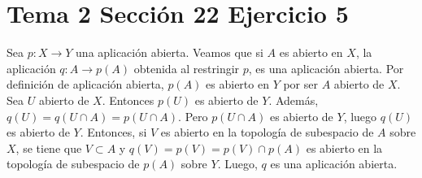 \documentclass{article}
\begin{document}
\section{Tema 2 Sección 22 Ejercicio 5}
Sea $p:X\rightarrow Y$ una aplicación abierta. Veamos que si $A$ es abierto en $X$, la aplicación $q:A\rightarrow p(A)$ obtenida al restringir $p$, es una aplicación abierta. Por definición de aplicación abierta,  $p(A)$ es abierto en $Y$ por ser $A$ abierto de $X$. Sea $U$  abierto de $X$. Entonces $p(U)$ es abierto de $Y$. Además, $q(U)=q(U\cap A)=p(U\cap A)$. Pero $p(U\cap A)$ es abierto de $Y$, luego $q(U)$ es abierto de $Y$. Entonces, si $V$ es abierto  en la topología de subespacio de $A$ sobre $X$, se tiene que $V\subset A$ y $q(V)=p(V)=p(V)\cap p(A)$ es abierto en la topología de subespacio de $p(A)$ sobre $Y$. Luego, $q$ es una aplicación abierta.
\end{document}
